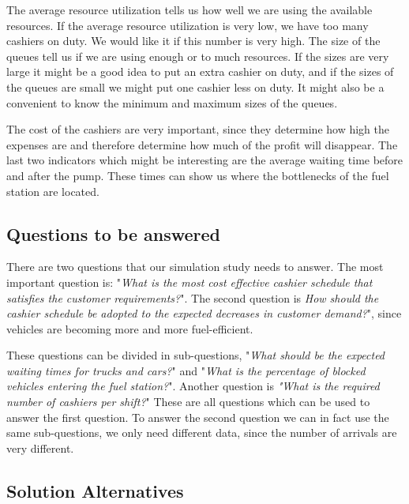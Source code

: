 The average resource utilization tells us how well we are using the available resources. 
If the average resource utilization is very low, we have too many cashiers on duty.
We would like it if this number is very high.
The size of the queues tell us if we are using enough or to much resources. 
If the sizes are very large it might be a good idea to put an extra cashier on duty, and if the sizes of the queues are small we might put one cashier less on duty. 
It might also be a convenient to know the minimum and maximum sizes of the queues.

The cost of the cashiers are very important, since they determine how high the expenses are and therefore determine how much of the profit will disappear. 
The last two indicators which might be interesting are the average waiting time before and after the pump. 
These times can show us where the bottlenecks of the fuel station are located. 

\subsection{Questions to be answered}
There are two questions that our simulation study needs to answer. 
The most important question is: "\textit{What is the most cost effective cashier schedule that satisfies the customer requirements?}". 
The second question is \textit{How should the cashier schedule be adopted to the expected decreases in customer demand?}", since vehicles are becoming more and more fuel-efficient.

These questions can be divided in sub-questions, "\textit{What should be the expected waiting times for trucks and cars?}" and "\textit{What is the percentage of blocked vehicles entering the fuel station?}". 
Another question is \textit{"What is the required number of cashiers per shift?}"
These are all questions which can be used to answer the first question. 
To answer the second question we can in fact use the same sub-questions, we only need different data, since the number of arrivals are very different. 

\subsection{Solution Alternatives}
